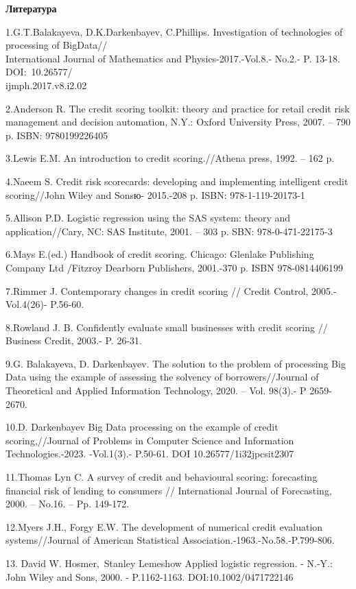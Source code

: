 \begin{center}
{\bfseries Литература}
\end{center}

\begin{noparindent}

1.G.T.Balakayeva, D.K.Darkenbayev, C.Phillips. Investigation of
technologies of processing of BigData//\\International Journal of
Mathematics and Physics-2017.-Vol.8.- No.2.- P. 13-18. DOI:~10.26577/\\ijmph.2017.v8.i2.02

2.Anderson R. The credit scoring toolkit: theory and practice for retail
credit risk management and decision automation, N.Y.: Oxford University
Press, 2007. -- 790 p. ISBN: 9780199226405

3.Lewis E.M. An introduction to credit scoring.//Athena press, 1992. --
162 p.

4.Naeem S. Credit risk scorecards: developing and implementing
intelligent credit scoring//John Wiley and Sonsю- 2015.-208 p. ISBN:
978-1-119-20173-1

5.Allison P.D. Logistic regression using the SAS system: theory and
application//Cary, NC: SAS Institute, 2001. -- 303 p. SBN:
978-0-471-22175-3

6.Mays E.(ed.) Handbook of credit scoring. Chicago: Glenlake Publishing
Company Ltd /Fitzroy Dearborn Publishers, 2001.-370 p. ISBN
978-0814406199

7.Rimmer J. Contemporary changes in credit scoring // Credit Control,
2005.-Vol.4(26)- P.56-60.

8.Rowland J. B. Confidently evaluate small businesses with credit
scoring // Business Credit, 2003.- P. 26-31.

9.G. Balakayeva, D. Darkenbayev. The solution to the problem of
processing Big Data using the example of assessing the solvency of
borrowers//Journal of Theoretical and Applied Information Technology,
2020. -- Vol. 98(3).- P 2659-2670.

10.D. Darkenbayev Big Data processing on the example of credit
scoring,//Journal of Problems in Computer Science and Information
Technologies.-2023. -Vol.1(3).- P.50-61. DOI 10.26577/1i32jpcsit2307

11.Thomas Lyn C. A survey of credit and behavioural scoring: forecasting
financial risk of lending to consumers // International Journal of
Forecasting, 2000. -- No.16. -- Pp. 149-172.

12.Myers J.H., Forgy E.W. The development of numerical credit evaluation
systems//Journal of American Statistical
Association.-1963.-No.58.-P.799-806.

13. David W. Hosmer,~Stanley Lemeshow Applied logistic regression. -
N.-Y.: John Wiley and Sons, 2000. - P.1162-1163. DOI:10.1002/0471722146
\end{noparindent}

